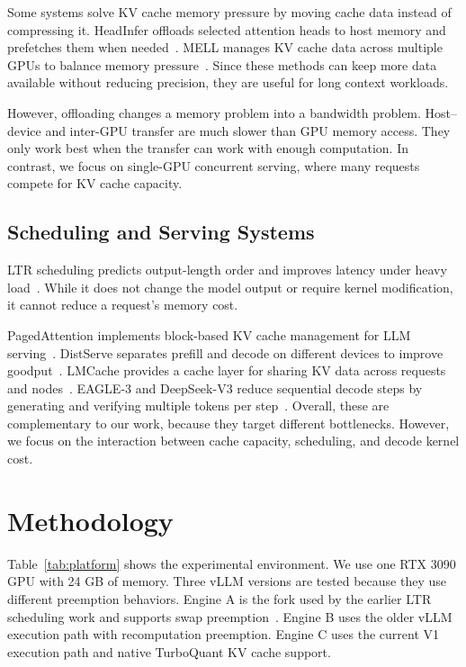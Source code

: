 \documentclass[conference]{IEEEtran}
\begin{document}
Some systems solve KV cache memory pressure by moving cache data instead of compressing it. HeadInfer offloads selected attention heads to host memory and prefetches them when needed~\cite{headinfer2025}. MELL manages KV cache data across multiple GPUs to balance memory pressure~\cite{mell2025}. Since these methods can keep more data available without reducing precision, they are useful for long context workloads.

However, offloading changes a memory problem into a bandwidth problem. Host--device and inter-GPU transfer are much slower than GPU memory access. They only work best when the transfer can work with enough computation. In contrast, we focus on single-GPU concurrent serving, where many requests compete for KV cache capacity.

\subsection{Scheduling and Serving Systems}

LTR scheduling predicts output-length order and improves latency under heavy load~\cite{fu2024ltr,kumar2026}. While it does not change the model output or require kernel modification, it cannot reduce a request's memory cost.

PagedAttention implements block-based KV cache management for LLM serving~\cite{vllm2023}. DistServe separates prefill and decode on different devices to improve goodput~\cite{distserve2024}. LMCache provides a cache layer for sharing KV data across requests and nodes~\cite{lmcache2025}. EAGLE-3 and DeepSeek-V3 reduce sequential decode steps by generating and verifying multiple tokens per step~\cite{eagle3_2025,deepseekv3_2024}. Overall, these are complementary to our work, because they target different bottlenecks. However, we focus on the interaction between cache capacity, scheduling, and decode kernel cost.

\clearpage
\section{Methodology}

Table~\ref{tab:platform} shows the experimental environment. We use one RTX 3090 GPU with 24 GB of memory. Three vLLM versions are tested because they use different preemption behaviors. Engine A is the fork used by the earlier LTR scheduling work and supports swap preemption~\cite{fu2024ltr}. Engine B uses the older vLLM execution path with recomputation preemption. Engine C uses the current V1 execution path and native TurboQuant KV cache support.
\end{document}
